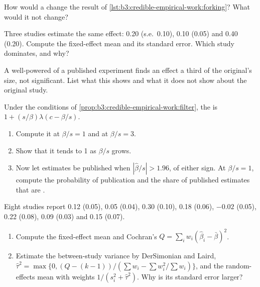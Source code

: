 \begin{exercise}[$\star\star$]\label{exo:b3:credible-empirical-work:7}
How would a  change the result of
\cref{lst:b3:credible-empirical-work:forking}? What would it not change?
\end{exercise}

\begin{exercise}[$\star\star$]\label{exo:b3:credible-empirical-work:8}
Three studies estimate the same effect: 0.20 (s.e.\ 0.10), 0.10 (0.05) and 0.40
(0.20). Compute the fixed-effect mean and its standard error. Which study
dominates, and why?
\end{exercise}

\begin{exercise}[$\star\star$]\label{exo:b3:credible-empirical-work:9}
A well-powered  of a published experiment finds an effect a third of
the original's size, not significant. List what this shows and what it does not
show about the original study.
\end{exercise}

\begin{exercise}[$\star\star\star$]\label{exo:b3:credible-empirical-work:10}
Under the conditions of \cref{prop:b3:credible-empirical-work:filter}, the
 is $1 + (s/\beta)\lambda(c - \beta/s)$.
\begin{enumerate}
\item Compute it at $\beta/s = 1$ and at $\beta/s = 3$.
\item Show that it tends to 1 as $\beta/s$ grows.
\item Now let estimates be published when $|\hat\beta/s| > 1.96$, of either sign.
At $\beta/s = 1$, compute the probability of publication and the share of
published estimates that are .
\end{enumerate}
\end{exercise}

\begin{exercise}[$\star\star\star$]\label{exo:b3:credible-empirical-work:11}
Eight studies report 0.12 (0.05), 0.05 (0.04), 0.30 (0.10), 0.18 (0.06), $-0.02$
(0.05), 0.22 (0.08), 0.09 (0.03) and 0.15 (0.07).
\begin{enumerate}
\item Compute the fixed-effect mean and Cochran's $Q = \sum_i w_i (\hat\beta_i -
\bar\beta)^2$.
\item Estimate the between-study variance by DerSimonian and Laird, $\hat\tau^2 =
\max\{0, (Q - (k - 1))/(\sum w_i - \sum w_i^2/\sum w_i)\}$, and the
random-effects mean with weights $1/(s_i^2 + \hat\tau^2)$. Why is its standard
error larger?
\end{enumerate}
\end{exercise}

